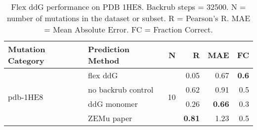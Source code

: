 \begin{table}
  \begin{tabular}{llrrrr}
\toprule
Mutation Category &   Prediction Method &   N &    R &  MAE &  FC \\
\midrule
 \multirow{ 4}{*}{pdb-1HE8} & flex ddG & \multirow{ 4}{*}{10} & 0.05 & 0.67 & \textbf{0.6}  \\
 & no backrub control & & 0.62 & 0.91 & 0.5  \\
 & ddG monomer & & 0.26 & \textbf{0.66} & 0.3  \\
 & ZEMu paper & & \textbf{0.81} & 1.23 & 0.5  \\
\bottomrule
\end{tabular}
  \caption[Flex ddG performance on PDB 1HE8]{
    Flex ddG performance on PDB 1HE8. Backrub steps = 32500. N = number of mutations in the dataset or subset. R = Pearson's R. MAE = Mean Absolute Error. FC = Fraction Correct.
  } \label{tab:table-pdb-1HE8}
\end{table}
